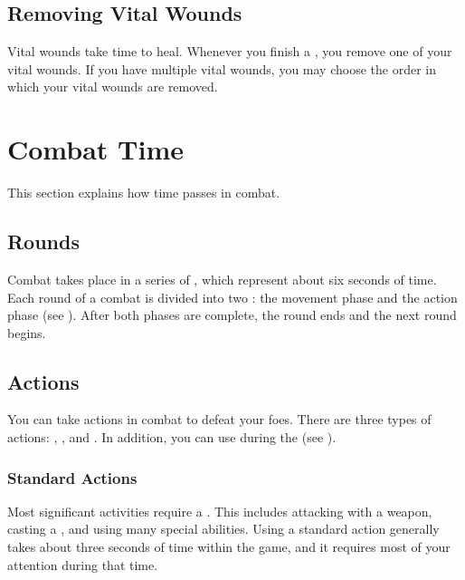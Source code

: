     \subsection{Removing Vital Wounds}\label{Removing Vital Wounds}
        Vital wounds take time to heal.
        Whenever you finish a , you remove one of your vital wounds.
        If you have multiple vital wounds, you may choose the order in which your vital wounds are removed.

\section{Combat Time}\label{Combat Time}
    This section explains how time passes in combat.

    \subsection{Rounds}\label{Rounds}

        Combat takes place in a series of , which represent about six seconds of time.
        Each round of a combat is divided into two : the movement phase and the action phase (see ).
        After both phases are complete, the round ends and the next round begins.

    \subsection{Actions}\label{Actions}

        You can take actions in combat to defeat your foes.
        There are three types of actions: , , and .
        In addition, you can use  during the  (see ).

        \subsubsection{Standard Actions}\label{Standard Actions}
            Most significant activities require a .
            This includes attacking with a weapon, casting a , and using many special abilities.
            Using a standard action generally takes about three seconds of time within the game, and it requires most of your attention during that time.

